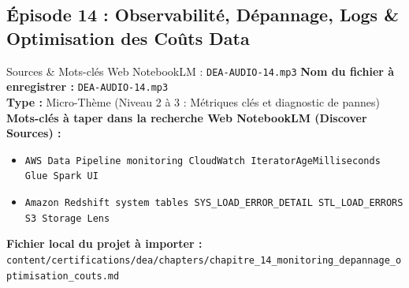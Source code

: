 \documentclass[11pt,a4paper]{article}
\begin{document}
\subsection{Épisode 14 : Observabilité, Dépannage, Logs \& Optimisation des Coûts Data}
\begin{sourcebox}{Sources \& Mots-clés Web NotebookLM : \texttt{DEA-AUDIO-14.mp3}}
\textbf{Nom du fichier à enregistrer :} \texttt{DEA-AUDIO-14.mp3}\\
\textbf{Type :} Micro-Thème (Niveau 2 à 3 : Métriques clés et diagnostic de pannes)\\
\textbf{Mots-clés à taper dans la recherche Web NotebookLM (Discover Sources) :}
\begin{itemize}[noitemsep]
    \item \texttt{AWS Data Pipeline monitoring CloudWatch IteratorAgeMilliseconds Glue Spark UI}
    \item \texttt{Amazon Redshift system tables SYS_LOAD_ERROR_DETAIL STL_LOAD_ERRORS S3 Storage Lens}
\end{itemize}
\textbf{Fichier local du projet à importer :}
\texttt{content/certifications/dea/chapters/chapitre_14_monitoring_depannage_optimisation_couts.md}
\end{sourcebox}
\end{document}
